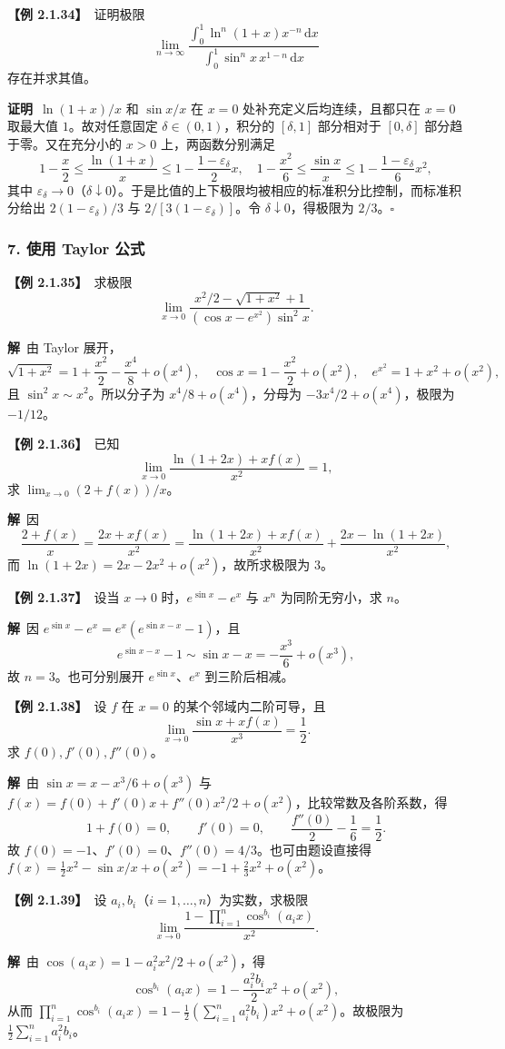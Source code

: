 \documentclass[UTF8,a4paper,11pt]{ctexart}
\newcommand{\ex}[1]{\par\medskip\noindent\textbf{【例 #1】}\ }
\newcommand{\pf}{\par\noindent\textbf{证明}\ }
\newcommand{\sol}{\par\noindent\textbf{解}\ }
\begin{document}
\ex{2.1.34}证明极限
\[
\lim_{n\to\infty}
\frac{\int_0^1 \ln^n(1+x)x^{-n}\,\mathrm dx}
{\int_0^1\sin^n x\,x^{1-n}\,\mathrm dx}
\]
存在并求其值。
\pf $\ln(1+x)/x$ 和 $\sin x/x$ 在 $x=0$ 处补充定义后均连续，且都只在 $x=0$ 取最大值 $1$。故对任意固定 $\delta\in(0,1)$，积分的 $[\delta,1]$ 部分相对于 $[0,\delta]$ 部分趋于零。又在充分小的 $x>0$ 上，两函数分别满足
\[
1-\frac{x}{2}\le\frac{\ln(1+x)}x
\le1-\frac{1-\varepsilon_\delta}{2}x,
\quad
1-\frac{x^2}{6}\le\frac{\sin x}x
\le1-\frac{1-\varepsilon_\delta}{6}x^2,
\]
其中 $\varepsilon_\delta\to0$（$\delta\downarrow0$）。于是比值的上下极限均被相应的标准积分比控制，而标准积分给出 $2(1-\varepsilon_\delta)/3$ 与 $2/[3(1-\varepsilon_\delta)]$。令 $\delta\downarrow0$，得极限为 $2/3$。\hfill$\square$

\subsubsection*{7. 使用 Taylor 公式}
\ex{2.1.35}求极限
\[
\lim_{x\to0}\frac{x^2/2-\sqrt{1+x^2}+1}{(\cos x-e^{x^2})\sin^2x}.
\]
\sol 由 Taylor 展开，
\[
\sqrt{1+x^2}=1+\frac{x^2}2-\frac{x^4}8+o(x^4),\quad
\cos x=1-\frac{x^2}2+o(x^2),\quad
e^{x^2}=1+x^2+o(x^2),
\]
且 $\sin^2x\sim x^2$。所以分子为 $x^4/8+o(x^4)$，分母为 $-3x^4/2+o(x^4)$，极限为 $-1/12$。

\ex{2.1.36}已知
\[
\lim_{x\to0}\frac{\ln(1+2x)+xf(x)}{x^2}=1,
\]
求 $\lim_{x\to0}(2+f(x))/x$。
\sol 因
\[
\frac{2+f(x)}x
=\frac{2x+xf(x)}{x^2}
=\frac{\ln(1+2x)+xf(x)}{x^2}
+\frac{2x-\ln(1+2x)}{x^2},
\]
而 $\ln(1+2x)=2x-2x^2+o(x^2)$，故所求极限为 $3$。

\ex{2.1.37}设当 $x\to0$ 时，$e^{\sin x}-e^x$ 与 $x^n$ 为同阶无穷小，求 $n$。
\sol 因 $e^{\sin x}-e^x=e^x(e^{\sin x-x}-1)$，且
\[
e^{\sin x-x}-1\sim\sin x-x=-\frac{x^3}{6}+o(x^3),
\]
故 $n=3$。也可分别展开 $e^{\sin x}$、$e^x$ 到三阶后相减。

\ex{2.1.38}设 $f$ 在 $x=0$ 的某个邻域内二阶可导，且
\[
\lim_{x\to0}\frac{\sin x+xf(x)}{x^3}=\frac12.
\]
求 $f(0),f'(0),f''(0)$。
\sol 由 $\sin x=x-x^3/6+o(x^3)$ 与 $f(x)=f(0)+f'(0)x+f''(0)x^2/2+o(x^2)$，比较常数及各阶系数，得
\[
1+f(0)=0,\qquad f'(0)=0,\qquad \frac{f''(0)}2-\frac16=\frac12.
\]
故 $f(0)=-1$、$f'(0)=0$、$f''(0)=4/3$。也可由题设直接得 $f(x)=\frac12x^2-\sin x/x+o(x^2)=-1+\frac23x^2+o(x^2)$。

\ex{2.1.39}设 $a_i,b_i$（$i=1,\ldots,n$）为实数，求极限
\[
\lim_{x\to0}\frac{1-\prod_{i=1}^{n}\cos^{b_i}(a_ix)}{x^2}.
\]
\sol 由 $\cos(a_ix)=1-a_i^2x^2/2+o(x^2)$，得
\[
\cos^{b_i}(a_ix)=1-\frac{a_i^2b_i}2x^2+o(x^2),
\]
从而 $\prod_{i=1}^{n}\cos^{b_i}(a_ix)=1-\frac12(\sum_{i=1}^{n}a_i^2b_i)x^2+o(x^2)$。故极限为 $\frac12\sum_{i=1}^{n}a_i^2b_i$。
\end{document}
